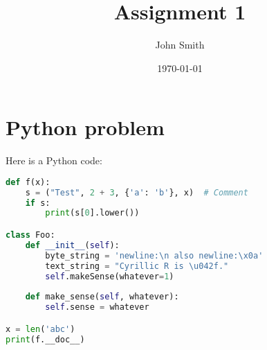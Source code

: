 \documentclass{classic}
\institute{University of Caen}
\date{\today}
\author{John Smith}
\title{Assignment 1}
\begin{document}
\makeheader

\section{Python problem}

Here is a Python code:

\begin{lstlisting}[language=Python]
def f(x):
	s = ("Test", 2 + 3, {'a': 'b'}, x)  # Comment
	if s:
		print(s[0].lower())

class Foo:
	def __init__(self):
		byte_string = 'newline:\n also newline:\x0a'
		text_string = "Cyrillic R is \u042f."
		self.makeSense(whatever=1)
	
	def make_sense(self, whatever):
		self.sense = whatever

x = len('abc')
print(f.__doc__)
\end{lstlisting}

\lipsum[1]
\end{document}
